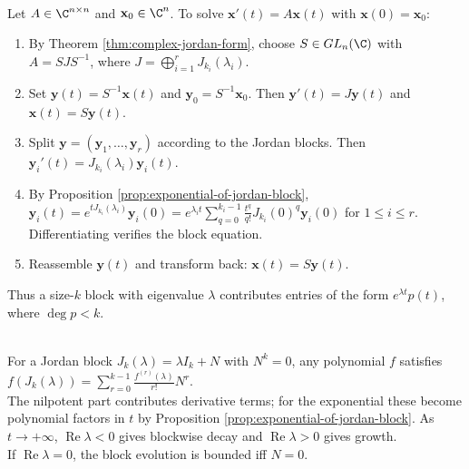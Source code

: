 \begin{method} \label{meth:solve-linear-ode-by-jordan-form} \\
Let $A\in\C^{n\times n}$ and $\mathbf{x}_0\in\C^n$. To solve $\mathbf{x}'(t)=A\mathbf{x}(t)$ with $\mathbf{x}(0)=\mathbf{x}_0$:
\begin{enumerate}[label=(\roman*)]
\setlength{\itemsep}{0pt}
\item By Theorem \ref{thm:complex-jordan-form}, choose $S\in GL_n(\C)$ with $A=SJS^{-1}$, where $J=\bigoplus\limits_{i=1}^rJ_{k_i}(\lambda_i)$.
\item Set $\mathbf{y}(t)=S^{-1}\mathbf{x}(t)$ and $\mathbf{y}_0=S^{-1}\mathbf{x}_0$. Then $\mathbf{y}'(t)=J\mathbf{y}(t)$ and $\mathbf{x}(t)=S\mathbf{y}(t)$.
\item Split $\mathbf{y}=(\mathbf{y}_1,\ldots,\mathbf{y}_r)$ according to the Jordan blocks. Then $\mathbf{y}_i'(t)=J_{k_i}(\lambda_i)\mathbf{y}_i(t)$.
\item By Proposition \ref{prop:exponential-of-jordan-block}, $\mathbf{y}_i(t)=e^{tJ_{k_i}(\lambda_i)}\mathbf{y}_i(0)=e^{\lambda_i t}\sum\limits_{q=0}^{k_i-1}\frac{t^q}{q!}J_{k_i}(0)^q\mathbf{y}_i(0)$ for $1\leq i\leq r$.\\
Differentiating verifies the block equation.
\item Reassemble $\mathbf{y}(t)$ and transform back: $\mathbf{x}(t)=S\mathbf{y}(t)$.
\end{enumerate}
Thus a size-$k$ block with eigenvalue $\lambda$ contributes entries of the form $e^{\lambda t}p(t)$, where $\deg p<k$.
\end{method}

\begin{perspective} \label{per:jordan-functions-polynomial-factors} \\
For a Jordan block $J_k(\lambda)=\lambda I_k+N$ with $N^k=0$, any polynomial $f$ satisfies $f(J_k(\lambda))=\sum\limits_{r=0}^{k-1}\frac{f^{(r)}(\lambda)}{r!}N^r$.\\
The nilpotent part contributes derivative terms; for the exponential these become polynomial factors in $t$ by Proposition \ref{prop:exponential-of-jordan-block}. As $t\to+\infty$, $\operatorname{Re}\lambda<0$ gives blockwise decay and $\operatorname{Re}\lambda>0$ gives growth.\\
If $\operatorname{Re}\lambda=0$, the block evolution is bounded iff $N=0$.
\end{perspective}

